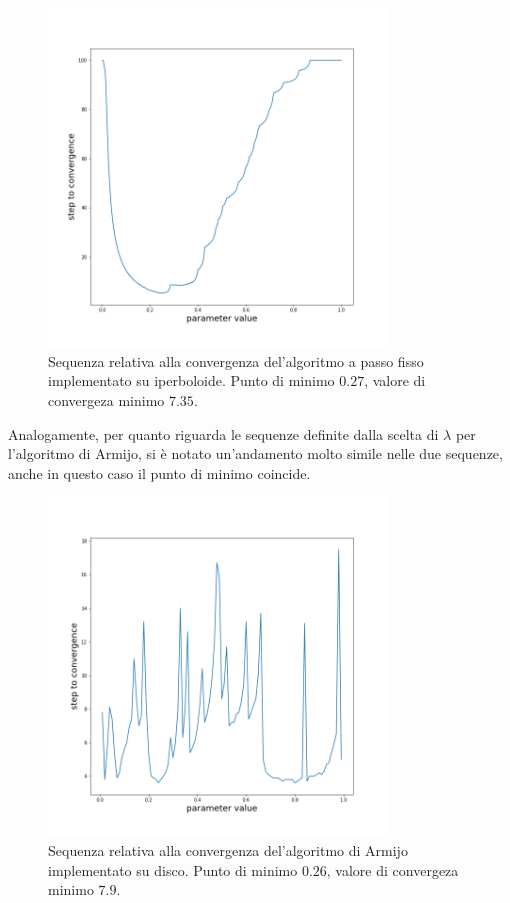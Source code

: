 \documentclass[a4paper, 12pt]{article}
\begin{document}
\begin{figure}[H] %
    \centering\includegraphics[width=0.8\textwidth]{fixed_step_parameter_hyperboloid.png}
    \caption{Sequenza relativa alla convergenza del'algoritmo a passo fisso implementato su iperboloide. Punto di minimo $0.27$, valore di convergeza minimo $7.35$.}
\end{figure}
Analogamente, per quanto riguarda le sequenze definite dalla scelta di $\lambda$ per l'algoritmo di Armijo, si è notato un'andamento molto simile nelle due sequenze, anche in questo caso il punto di minimo coincide.\\
\begin{figure}[H] %
    \centering\includegraphics[width=0.8\textwidth]{armijo_parameter_poincare.png}
    \caption{Sequenza relativa alla convergenza del'algoritmo di Armijo implementato su disco. Punto di minimo $0.26$, valore di convergeza minimo $7.9$.}
\end{figure}
\end{document}
